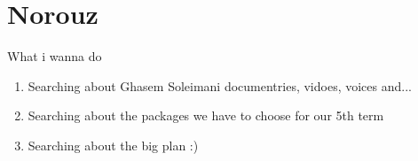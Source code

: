\chapter{Norouz}
	\begin{sansserif}
	\end{sansserif}
	\clearpage
	
	\noindent What i wanna do
	\begin{enumerate}
		\item Searching about Ghasem Soleimani documentries, vidoes, voices and...
		\item Searching about the packages we have to choose for our 5th term
		\item Searching about the big plan :)
	\end{enumerate}
